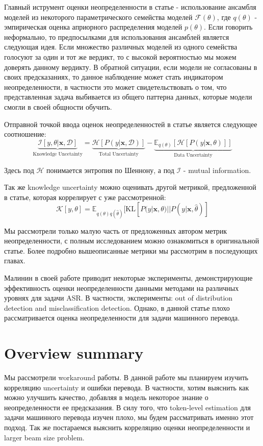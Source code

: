 \documentclass[a4paper,14pt]{extarticle}
\begin{document}
	Главный иструмент оценки неопределенности в статье - использование ансамбля моделей из некоторого параметрического семейства моделей $\mathcal{F}(\theta)$, где $q(\theta)$ - эмпирическая оценка априорного распределения моделей $p(\theta)$. Если говорить неформально, то предпосылками для использования ансамблей является следующая идея. Если множество различных моделей из одного семейства голосуют за один и тот же вердикт, то с высокой вероятностью мы можем доверять данному вердикту. В обратной ситуации, если модели не согласованы в своих предсказаниях, то данное наблюдение может стать индикатором неопределенности, в частности это может свидетельствовать о том, что представленная задача выбивается из общего паттерна данных, которые модели смогли в своей общности обучить.
	
	Отправной точкой ввода оценок неопределенностей в статье является следующее соотношение:
	\begin{equation}
		\underbrace{\mathcal{I}[y, \theta|\textbf{x}, \mathcal{D}]}_\text{Knowledge Uncetainty}
		= 
		\underbrace{\mathcal{H}[P(y | \textbf{x}, \mathcal{D})]}_\text{Total Uncertainty}
		-
		\underbrace{\mathbb{E}_{q(\theta)}[\mathcal{H}[P(y| \textbf{x}, \theta)]]}_\text{Data Uncertainty}
	\end{equation}
	
	Здесь под $\mathcal{H}$ понимается энтропия по Шеннону, а под $\mathcal{I}$ - mutual information.
	
	Так же knowledge uncertainty можно оценивать другой метрикой, предложенной в статье, которая коррелирует с уже рассмотренной:
	\begin{equation}
		\mathcal{K}[y, \theta] = \mathbb{E}_{q(\theta)q(\hat{\theta})}[
			\mathrm{KL}[P(y|\textbf{x}, \theta) || P(y|\textbf{x}, \hat{\theta})
		]
	\end{equation}
	
	Мы рассмотрели только малую часть от предложенных автором метрик неопределенности, с полным исследованием можно ознакомиться в оригинальной статье. Более подробно вышеописанные метрики мы рассмотрим в последующих главах.
	
	Малинин в своей работе приводит некоторые эксперименты, демонстрирующие эффективность оценки неопределенности данными методами на различных уровнях для задачи ASR. В частности, эксперименты: out of distribution detection and misclassification detection. Однако, в данной статье плохо рассматривается оценка неопределенности для задачи машинного перевода.
	\section{Overview summary}
	Мы рассмотрели workaround работы. В данной работе мы планируем изучить корреляцию uncertainty и ошибки перевода. В частности, хотим выяснить как можно улучшить качество, добавляя в модель некоторое знание о неопределенности ее предсказания. В силу того, что token-level estimation для задачи машинного перевода изучен плохо, мы будем рассматривать именно этот подход. Так же постараемся выяснить корреляцию оценки неопределенности и larger beam size problem.
\end{document}
